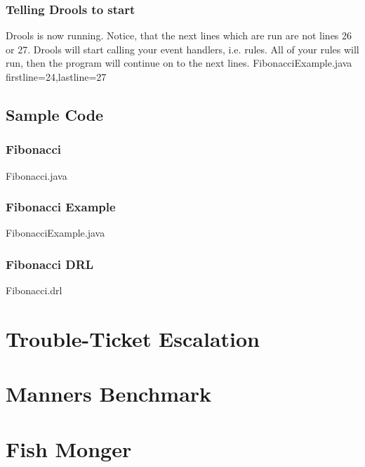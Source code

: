 \subsection {Telling Drools to start}
Drools is now running. 
Notice, that the next lines which are run are not lines 26 or 27. 
Drools will start calling your event handlers, i.e. rules.
All of your rules will run, then the program will continue on to the next lines.
 {FibonacciExample.java} {firstline=24,lastline=27}



\clearpage
\section {Sample Code}
\subsection {Fibonacci}
 {Fibonacci.java}

\clearpage
\subsection {Fibonacci Example}
 {FibonacciExample.java}

\clearpage
\subsection {Fibonacci DRL}
 {Fibonacci.drl}





\cleardoublepage
\chapter{Trouble-Ticket Escalation}

\cleardoublepage
\chapter{Manners Benchmark}



\cleardoublepage
\chapter{Fish Monger}
